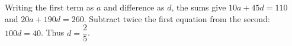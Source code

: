 Writing the first term as $a$ and difference as $d$, the sums give $10a+45d=110$ and $20a+190d=260$. Subtract twice the first equation from the second: $100d=40$. Thus $\boxed{d=\dfrac{2}{5}}$.
